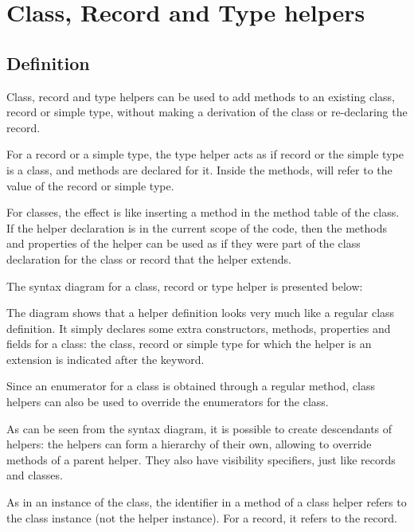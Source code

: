 \chapter{Class, Record and Type helpers}
\label{ch:ClassHelpers}
%

\section{Definition}
Class, record and type helpers can be used to add methods to an existing class,
record or simple type, without making a derivation of the class or re-declaring the record.

For a record or a simple type, the type helper acts as if record or the simple type
is a class, and methods are declared for it. Inside the methods,  will refer
to the value of the record or simple type.

For classes, the effect is like inserting a method in the method table of the class.
If the helper declaration is in the current scope of the code, then the
methods and properties of the helper can be used as if they were part of the
class declaration for the class or record that the helper extends.

The syntax diagram for a class, record or type helper is presented below:

The diagram shows that a helper definition looks very much like a regular
class definition. It simply declares some extra constructors, methods, properties and fields
for a class: the class, record or simple type for which the helper is an extension is indicated
after the  keyword.

Since an enumerator for a class is obtained through a regular method,
class helpers can also be used to override the enumerators for the class.

As can be seen from the syntax diagram, it is possible to create descendants of helpers:
the helpers can form a hierarchy of their own, allowing to override methods of a
parent helper. They also have visibility specifiers, just like records and
classes.

As in an instance of the class, the  identifier in a method of a
class helper refers to the class instance (not the helper instance). For a
record, it refers to the record.

